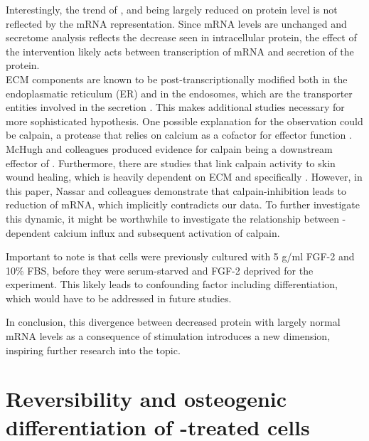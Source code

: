 Interestingly, the trend of \colone{}, \colthree{} and \Fn{} being largely reduced on protein level is not reflected by the mRNA representation. Since mRNA levels are unchanged and secretome analysis reflects the decrease seen in intracellular protein, the effect of the intervention likely acts between transcription of mRNA and secretion of the protein. \\

ECM components are known to be post-transcriptionally modified both in the endoplasmatic reticulum (ER) and in the endosomes, which are the transporter entities involved in the secretion \cite{Ishida2011, Zeltz2014}. This makes additional studies necessary for more sophisticated hypothesis. One possible explanation for the observation could be calpain, a protease that relies on calcium as a cofactor for effector function \cite{Goll2003}. McHugh and colleagues produced evidence for calpain being a downstream effector of \Piezo{} \cite{McHugh2010}. Furthermore, there are studies that link calpain activity to skin wound healing, which is heavily dependent on ECM and specifically \colone{} \cite{Nassar2012}. However, in this paper, Nassar and colleagues demonstrate that calpain-inhibition leads to reduction of \colone{} mRNA, which implicitly contradicts our data. To further investigate this dynamic, it might be worthwhile to investigate the relationship between \Piezo{}-dependent calcium influx and subsequent activation of calpain. \par

Important to note is that cells were previously cultured with 5 \textmu{}g/ml FGF-2 and 10\% FBS, before they were serum-starved and FGF-2 deprived for the experiment. This likely leads to confounding factor including differentiation, which would have to be addressed in future studies.\par

In conclusion, this divergence between decreased protein with largely normal mRNA levels as a consequence of \Piezo{} stimulation introduces a new dimension, inspiring further research into the topic.


\section{Reversibility and osteogenic differentiation of \Yoda{}-treated cells}

